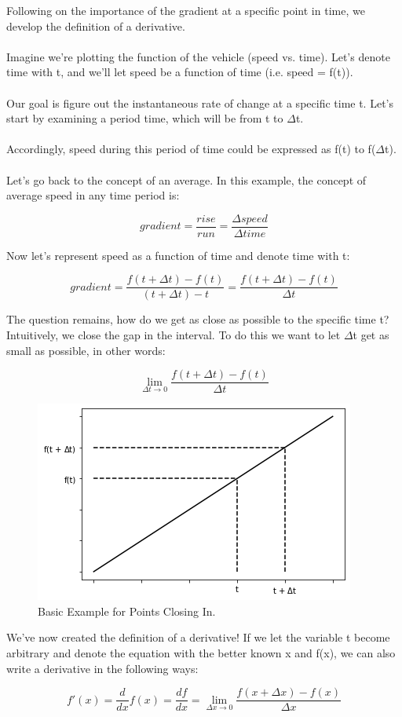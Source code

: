 \documentclass{article}
\begin{document}
Following on the importance of the gradient at a specific point in time, we develop the definition of a derivative.
\\\\
Imagine we're plotting the function of the vehicle (speed vs. time). Let's denote time with t, and we'll let speed be a function of time (i.e. speed = f(t)).
\\\\
Our goal is figure out the instantaneous rate of change at a specific time t. Let's start by examining a period time, which will be from t to $\Delta$t.
\\\\
Accordingly, speed during this period of time could be expressed as f(t) to f($\Delta$t).
\\\\
Let's go back to the concept of an average. In this example, the concept of average speed in any time period is:

\[
gradient = \frac{rise}{run} = \frac{\Delta speed}{\Delta time}
\]

Now let's represent speed as a function of time and denote time with t:

\[
gradient = \frac{f(t + \Delta t) - f(t)}{(t + \Delta t) - t} = \frac{f(t + \Delta t) - f(t)}{\Delta t}
\]

The question remains, how do we get as close as possible to the specific time t? Intuitively, we close the gap in the interval. To do this we want to let $\Delta$t get as small as possible, in other words:

\[
\lim_{\Delta t \to 0} \frac{f(t + \Delta t) - f(t)}{\Delta t}
\]

\begin{figure}
	\includegraphics{images/figure1.png}
	\caption{Basic Example for Points Closing In.}\label{fig:figure1}
\end{figure}

We've now created the definition of a derivative! If we let the variable t become arbitrary and denote the equation with the better known x and f(x), we can also write a derivative in the following ways:

\[
f'(x) = \frac{d}{dx}f(x) = \frac{df}{dx} = \lim_{\Delta x \to 0} \frac{f(x + \Delta x) - f(x)}{\Delta x}
\]
\end{document}
